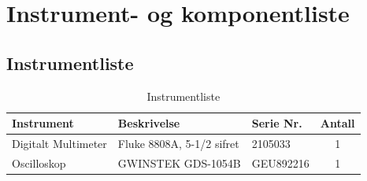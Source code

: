 \section{Instrument- og komponentliste}

\subsection{Instrumentliste}
\begin{table}[h]
    \centering
    \caption{Instrumentliste}
    \vspace{1em}
    \label{tab:instrumentliste}
    \begin{tabular}{|l|l|l|c|}
        \hline
        \rowcolor[gray]{0.9}
        \textbf{Instrument} & \textbf{Beskrivelse} & \textbf{Serie Nr.} & \textbf{Antall} \\ \hline
        Digitalt Multimeter & Fluke 8808A, 5-1/2 sifret  & 2105033 & 1 \\ \hline
        Oscilloskop & GWINSTEK GDS-1054B & GEU892216 & 1 \\ \hline
    \end{tabular}
\end{table}
